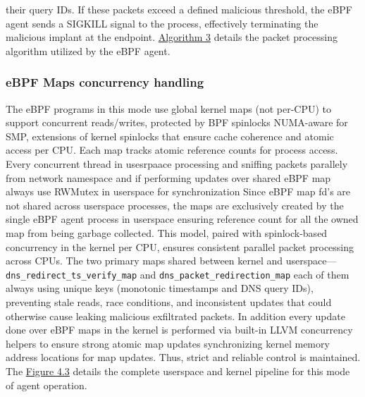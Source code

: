 \documentclass [11pt, proquest] {uwthesis}[2020/02/24]
\begin{document}
their query IDs. If these packets exceed a defined malicious threshold, the eBPF agent sends a SIGKILL signal to the process, effectively terminating the malicious implant at the endpoint.
\hyperref[sec:alg3]{Algorithm 3} details the packet processing algorithm utilized by the eBPF agent.


\subsubsection{\textbf{eBPF Maps concurrency handling}}
\label{active:sec3}
The eBPF programs in this mode use global kernel maps (not per-CPU) to support concurrent reads/writes, protected by BPF spinlocks NUMA-aware for SMP, extensions of kernel spinlocks that ensure cache coherence and atomic access per CPU. Each map tracks atomic reference counts for process access. Every concurrent thread in usesrpaace processing and sniffing packets parallely from network namespace and if performing updates over shared eBPF map always use RWMutex in userspace for synchronization Since eBPF map fd's are not shared across userspace processes, the maps are exclusively created by the single eBPF agent process in userspace ensuring reference count for all the owned map from being garbage collected. This model, paired with spinlock-based concurrency in the kernel per CPU, ensures consistent parallel packet processing across CPUs. The two primary maps shared between kernel and userspace—\texttt{dns\_redirect\_ts\_verify\_map} and \texttt{dns\_packet\_redirection\_map} each of them always using unique keys (monotonic timestamps and DNS query IDs), preventing stale reads, race conditions, and inconsistent updates that could otherwise cause leaking malicious exfiltrated packets. In addition every update done over eBPF maps in the kernel is performed via built-in LLVM concurrency helpers to ensure strong atomic map updates synchronizing kernel memory address locations for map updates. Thus, strict and reliable control is maintained. The \hyperref[sec:dp-active-phase]{Figure 4.3} details the complete userspace and kernel pipeline for this mode of agent operation. 
\end{document}
